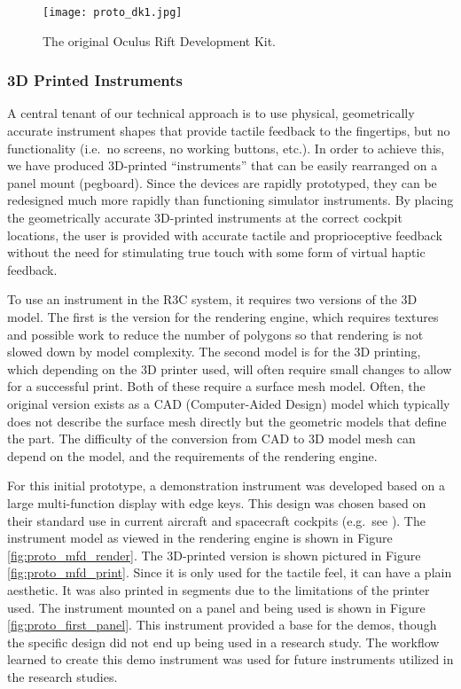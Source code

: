 \begin{figure}
    \centering
    \texttt{[image: proto\_dk1.jpg]}
    \caption{The original Oculus Rift Development Kit.}
    \label{fig:proto_oculus}
\end{figure}

\subsubsection{3D Printed Instruments}

A central tenant of our technical approach is to use physical, geometrically accurate instrument shapes that provide tactile feedback to the fingertips, but no functionality (i.e.\ no screens, no working buttons, etc.).
In order to achieve this, we have produced 3D-printed ``instruments'' that can be easily rearranged on a panel mount (pegboard).
Since the devices are rapidly prototyped, they can be redesigned much more rapidly than functioning simulator instruments.
By placing the geometrically accurate 3D-printed instruments at the correct cockpit locations, the user is provided with accurate tactile and proprioceptive feedback without the need for stimulating true touch with some form of virtual haptic feedback.

To use an instrument in the R3C system, it requires two versions of the 3D model.
The first is the version for the rendering engine, which requires textures and possible work to reduce the number of polygons so that rendering is not slowed down by model complexity.
The second model is for the 3D printing, which depending on the 3D printer used, will often require small changes to allow for a successful print.
Both of these require a surface mesh model.
Often, the original version exists as a CAD (Computer-Aided Design) model which typically does not describe the surface mesh directly but the geometric models that define the part.
The difficulty of the conversion from CAD to 3D model mesh can depend on the model, and the requirements of the rendering engine.

For this initial prototype, a demonstration instrument was developed based on a large multi-function display with edge keys.
This design was chosen based on their standard use in current aircraft and spacecraft cockpits (e.g.\ see \citet{us_department_of_defense_department_1999}).
The instrument model as viewed in the rendering engine is shown in Figure \ref{fig:proto_mfd_render}.
The 3D-printed version is shown pictured in Figure \ref{fig:proto_mfd_print}.
Since it is only used for the tactile feel, it can have a plain aesthetic.
It was also printed in segments due to the limitations of the printer used.
The instrument mounted on a panel and being used is shown in Figure \ref{fig:proto_first_panel}.
This instrument provided a base for the demos, though the specific design did not end up being used in a research study.
The workflow learned to create this demo instrument was used for future instruments utilized in the research studies.


